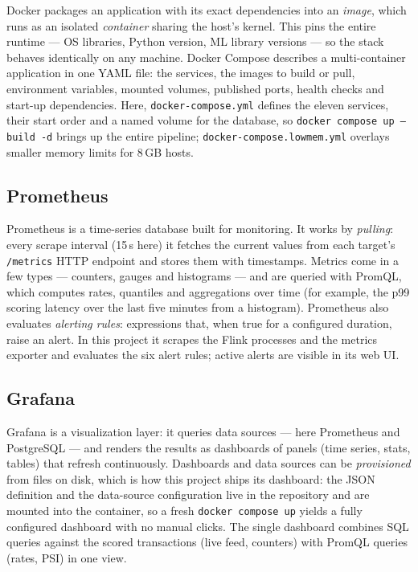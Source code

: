 \documentclass[11pt,a4paper]{article}
\newcommand{\code}[1]{\texttt{#1}}
\begin{document}
Docker packages an application with its exact dependencies into an
\emph{image}, which runs as an isolated \emph{container} sharing the host's
kernel. This pins the entire runtime --- OS libraries, Python version, ML
library versions --- so the stack behaves identically on any machine. Docker
Compose describes a multi-container application in one YAML file: the
services, the images to build or pull, environment variables, mounted
volumes, published ports, health checks and start-up dependencies. Here,
\code{docker-compose.yml} defines the eleven services, their start order and
a named volume for the database, so \code{docker compose up --build -d}
brings up the entire pipeline; \code{docker-compose.lowmem.yml} overlays
smaller memory limits for 8\,GB hosts.

\subsection{Prometheus}

Prometheus is a time-series database built for monitoring. It works by
\emph{pulling}: every scrape interval (15\,s here) it fetches the current
values from each target's \code{/metrics} HTTP endpoint and stores them with
timestamps. Metrics come in a few types --- counters, gauges and histograms
--- and are queried with PromQL, which computes rates, quantiles and
aggregations over time (for example, the p99 scoring latency over the last
five minutes from a histogram). Prometheus also evaluates \emph{alerting
rules}: expressions that, when true for a configured duration, raise an
alert. In this project it scrapes the Flink processes and the metrics
exporter and evaluates the six alert rules; active alerts are visible in its
web UI.

\subsection{Grafana}

Grafana is a visualization layer: it queries data sources --- here Prometheus
and PostgreSQL --- and renders the results as dashboards of panels (time
series, stats, tables) that refresh continuously. Dashboards and data
sources can be \emph{provisioned} from files on disk, which is how this
project ships its dashboard: the JSON definition and the data-source
configuration live in the repository and are mounted into the container, so
a fresh \code{docker compose up} yields a fully configured dashboard with no
manual clicks. The single dashboard combines SQL queries against the scored
transactions (live feed, counters) with PromQL queries (rates, PSI) in one
view.
\end{document}
